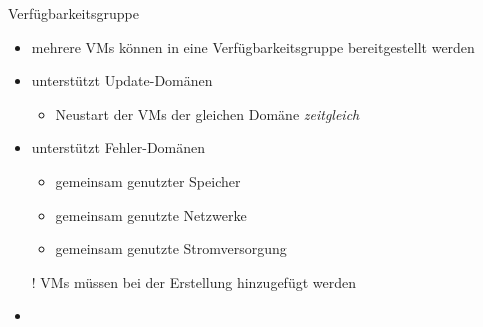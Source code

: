\begin{flashcard}[]{Verfügbarkeitsgruppe}
  \begin{itemize}
    \item mehrere VMs können in eine Verfügbarkeitsgruppe bereitgestellt werden
    \item unterstützt Update-Domänen
      \begin{itemize}
        \item Neustart der VMs der gleichen Domäne \emph{zeitgleich}
      \end{itemize}
    \item unterstützt Fehler-Domänen
      \begin{itemize}
         \item gemeinsam genutzter Speicher
         \item gemeinsam genutzte Netzwerke
         \item gemeinsam genutzte Stromversorgung
      \end{itemize}
    \item[!] VMs müssen bei der Erstellung hinzugefügt werden
  \end{itemize}
\end{flashcard}

\begin{flashcard}[]{}
  \begin{itemize}
    \item 
  \end{itemize}
\end{flashcard}

